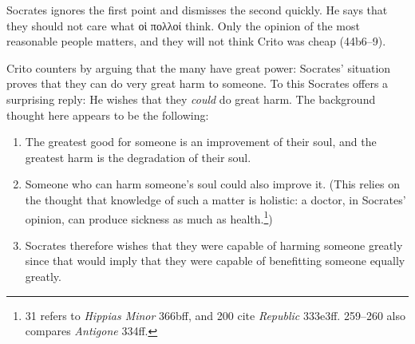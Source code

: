 \documentclass[12pt,letterpaper]{article}
\begin{document}
Socrates ignores the first point and dismisses the second quickly. He says that they should not care what \textgreek{οἱ πολλοί} think. Only the opinion of the most reasonable people matters, and they will not think Crito was cheap (44b6--9).

Crito counters by arguing that the many have great power: Socrates' situation proves that they can do very great harm to someone. To this Socrates offers a surprising reply: He wishes that they \emph{could} do great harm. The background thought here appears to be the following:

\begin{enumerate}

    \item The greatest good for someone is an improvement of their soul, and the greatest harm is the degradation of their soul.

    \item Someone who can harm someone's soul could also improve it. (This relies on the thought that knowledge of such a matter is holistic: a doctor, in Socrates' opinion, can produce sickness as much as health.\footnote{\cite{adam1988-crito} 31 refers to \textit{Hippias Minor} 366bff, and \cite{brickhouse-smith2004-plato-trial-of-socrates} 200 cite \textit{Republic} 333e3ff. \cite{burnet1924-euthyphro-apology-crito} 259--260 also compares \textit{Antigone} 334ff.})

    \item Socrates therefore wishes that they were capable of harming someone greatly since that would imply that they were capable of benefitting someone equally greatly.

\end{enumerate}
\end{document}

